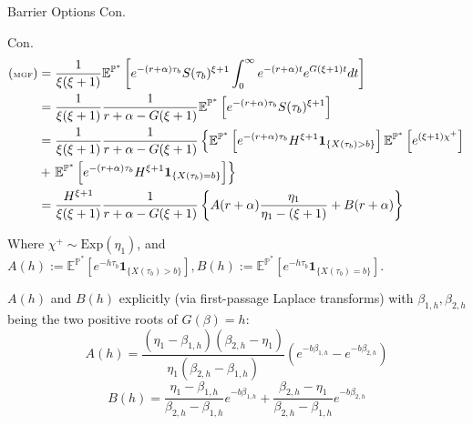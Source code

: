 \documentclass{beamer}
\begin{document}
\begin{frame}{Barrier Options Con.}

    {\footnotesize \scriptsize
    \par Con.
    \begin{align*}
         {\footnotesize \tiny(\text{MGF})}  &=\frac{1}{\xi (\xi + 1)} \mathbb{E}^{\mathbb{P}^*} \left[ e^{-(r + \alpha) \tau_b} 
            S(\tau_b)^{\xi+1} \int_0^\infty e^{-(r+\alpha)t} e^{G(\xi+1)t} dt 
           \right]\\
        & = \frac{1}{\xi(\xi+1)} \frac{1}{r + \alpha - G(\xi+1)} \mathbb{E}^{\mathbb{P}^*} \left[ e^{-(r+\alpha) \tau_b} S(\tau_b)^{\xi+1} \right]\\
        &= \frac{1}{\xi(\xi+1)} \frac{1}{r + \alpha - G(\xi+1)} \left\{\mathbb{E}^{\mathbb{P}^*} \left[ e^{-(r+\alpha) \tau_b} H^{\xi+1} \mathbf{1}_{\{X(\tau_b)>b\}} \right] 
        \mathbb{E}^{\mathbb{P}^*} \left[ e^{(\xi+1)\chi^+} \right]\right. \\
        & +\left. \mathbb{E}^{\mathbb{P}^*} \left[ e^{-(r+\alpha) \tau_b} H^{\xi+1} \mathbf{1}_{\{X(\tau_b)=b\}} \right] \right\}\\
        & = \frac{H^{\xi+1}}{\xi(\xi+1)} \frac{1}{r + \alpha - G(\xi+1)} 
        \left\{ A(r + \alpha) \frac{\eta_1}{\eta_1 - (\xi+1)} + B(r + \alpha) \right\}
    \end{align*}
    \par \pause  Where \( \chi^+ \sim \text{Exp}(\eta_1) \), and $A(h) := \mathbb{E}^{\mathbb{P}^*} [e^{-h\tau_b} \mathbf{1}_{\{X(\tau_b) > b\}}],  B(h) := \mathbb{E}^{\mathbb{P}^*} [e^{-h\tau_b} \mathbf{1}_{\{X(\tau_b) = b\}}].$
    \par \( A(h) \) and \( B(h) \) explicitly (via first-passage Laplace transforms) with \(\beta_{1,h}, \beta_{2,h}\) being the two positive roots of \( G(\beta) = h\):
        \[
        A(h) = \frac{(\eta_1 - \beta_{1,h})(\beta_{2,h} - \eta_1)}{\eta_1 (\beta_{2,h} - \beta_{1,h})} \left( e^{-b\beta_{1,h}} - e^{-b\beta_{2,h}} \right)
        \]
        \[
        B(h) = \frac{\eta_1 - \beta_{1,h}}{\beta_{2,h} - \beta_{1,h}} e^{-b\beta_{1,h}} + \frac{\beta_{2,h} - \eta_1}{\beta_{2,h} - \beta_{1,h}} e^{-b\beta_{2,h}}
        \]
    }
\end{frame}
\end{document}
